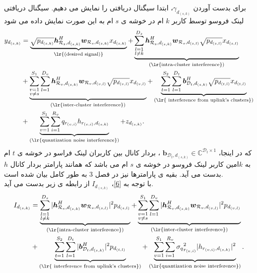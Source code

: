 برای بدست آوردن  $\gamma_{d_{(s,k)}}$، ابتدا سیگنال دریافتی را نمایش می دهیم. سیگنال دریافتی لینک فروسو توسط کاربر $k$ ام در خوشه ی $s$ ام به این صورت نمایش داده می شود
\begin{equation}\label{6}
\begin{split}
y_{d_{(s,k)}} &= \underbrace{\sqrt{p_{d_{(s,k)}}}\boldsymbol{h}_{\mathcal{R}_s, d_{(s,k)}}^H \boldsymbol{w}_{\mathcal{R}_{s},d_{(s,k)}} x_{d_{(s,k)}} }_{\text{\lr{(desired signal)}}} + \underbrace{\sum_{\substack{l=1 \\ l\neq k}}^{{D}_s} \boldsymbol{h}_{\mathcal{R}_s, d_{(s,k)}}^H \boldsymbol{w}_{\mathcal{R}_{s},d_{(s,l)}}  \sqrt{p_{d_{(s,l)}}}  x_{d_{(s,l)}}}_{\text{(\lr{intra-cluster interference})}}\\
&+\underbrace{\sum_{\substack{v=1 \\ v\neq s}}^{S_1} \sum_{l=1}^{{D}_v} \boldsymbol{h}_{\mathcal{R}_v, d_{(s,k)}}^H \boldsymbol{w}_{\mathcal{R}_{v},d_{(v,l)}} 
\sqrt{p_{d_{(v,l)}}}  x_{d_{(v,l)}}}_{\text{(\lr{inter-cluster interference})}}+\underbrace{\sum_{\substack{t=1}}^{S_2} \sum_{l=1}^{{D}_t} \boldsymbol{b}_{\mathcal{D}_t, d_{(s,k)}}^H \sqrt{ p_{d_{(t,l)}}}  x_{d_{(t,l)}}}_{\text{(\lr{ interference from uplink's clusters})}}  \\
& +\underbrace{ \sum_{v=1}^{S_1} \sum_{i=1}^{{R}_v} q_{r_{(v,i)}} h_{r_{(v,i)}, d_{(s,k)}} }_{\text{(\lr{quantization noise interference})}}+ z_{d_{(s,k)}} .\\
\end{split}
\end{equation}
که در اینجا،
 $\boldsymbol{b}_{\mathcal{D}_t, d_{(s,k)}}  \in \mathbb{C}^{\mathcal{D}_t\times 1}$
 ، بردار کانال بین کاربران لینک فراسو در خوشه ی $t$ ام به $k$امین کاربر لینک فروسو در خوشه ی   $s$
 ام 
می باشد که همانند پارامتر بردار کانال $h$ بدست می آید. بقیه ی پارامترها نیز در فصل 3 به طور کامل بیان شده است.\\
با توجه به \eqref{6}، 
$I_{d_{(s,k)}}$ 
از رابطه ی زیر  بدست می آید.
\begin{equation}\label{7}
\begin{split}
I_{d_{(s,k)}} &=  \underbrace{\sum_{\substack{l=1 \\ l\neq k}}^{{D}_s} |\boldsymbol{h}_{\mathcal{R}_s, d_{(s,k)}}^H \boldsymbol{w}_{\mathcal{R}_{s},d_{(s,l)}}|^2  p_{d_{(s,l)}}}_{\text{(\lr{intra-cluster interference})}}
+\underbrace{\sum_{\substack{v=1 \\ v\neq s}}^{S_1} \sum_{l=1}^{{D}_v} |\boldsymbol{h}_{\mathcal{R}_v, d_{(s,k)}}^H \boldsymbol{w}_{\mathcal{R}_{v},d_{(v,l)}}|^2 p_{d_{(v,l)}}}_{\text{(\lr{inter-cluster interference})}}\\
&+\underbrace{\sum_{\substack{t=1}}^{S_2} \sum_{l=1}^{{D}_t} |\boldsymbol{b}_{\mathcal{D}_t, d_{(s,k)}}^H|^2  p_{d_{(t,l)}}}_{\text{(\lr{ interference from uplink's clusters})}} 
 +\underbrace{ \sum_{v=1}^{S_1} \sum_{i=1}^{{R}_v} {\sigma_q}_{r_{(v,i)}}^2  |h_{r_{(v,i)}, d_{(s,k)}}|^2 }_{\text{(\lr{quantization noise interference})}}.
\end{split}
\end{equation}
